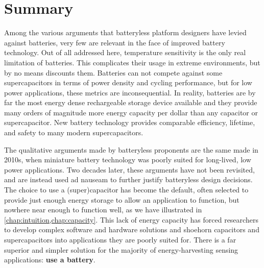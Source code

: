 
\section{Summary}
Among the various arguments that batteryless platform designers have levied against batteries, very few are relevant in the face of improved battery technology. Out of all addressed here, temperature sensitivity is the only real limitation of batteries. This complicates their usage in extreme environments, but by no means discounts them. Batteries can not compete against some supercapacitors in terms of power density and cycling performance, but for low power applications, these metrics are inconsequential. 
In reality, batteries are by far the most energy dense rechargeable storage device available and they provide many orders of magnitude more energy capacity per dollar than any capacitor or supercapacitor. New battery technology provides comparable efficiency, lifetime, and safety to many modern supercapacitors. 

The qualitative arguments made by batteryless proponents are the same made in 2010s, when miniature battery technology was poorly suited for long-lived, low power applications. Two decades later, these arguments have not been revisited, and are instead used ad nauseam to further justify batteryless design decisions.
The choice to use a (super)capacitor has become the default, often selected to provide just enough energy storage to allow an application to function, but nowhere near enough to function well, as we have illustrated in \cref{chap:intuition,chap:capacity}. This lack of energy capacity has forced researchers to develop complex software and hardware solutions and shoehorn capacitors and supercapacitors into applications they are poorly suited for. There is a far superior and simpler solution for the majority of energy-harvesting sensing applications: \textbf{use a battery}.

